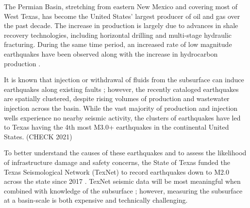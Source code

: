 \documentclass{utexasthesis}
\begin{document}
The Permian Basin, stretching from eastern New Mexico and covering most of West Texas, has become the United States' largest producer of oil and gas over the past decade. The increase in production is largely due to advances in shale recovery technologies, including horizontal drilling and multi-stage hydraulic fracturing.
During the same time period, an increased rate of low magnitude earthquakes have been observed along with the increase in hydrocarbon production
\citep{Frohlich2016HistoricalReviewInduced, Atkinson2016HydraulicFracturingSeismicity, Frohlich2019OnsetCauseIncreased, Lomax2019ImprovingAbsoluteEarthquake, Savvaidis2020InducedSeismicityDelaware, Skoumal2020InducedSeismicityDelaware}.

It is known that injection or withdrawal of fluids from the subsurface can induce earthquakes along existing faults \citep{Simpson1988TwoTypesReservoir, Ellsworth2013InjectionInducedEarthquakes}; however, the recently cataloged earthquakes are spatially clustered, despite rising volumes of production and wastewater injection across the basin. 
While the vast majority of production and injection wells experience no nearby seismic activity, the clusters of earthquakes have led to Texas having the 4th most M3.0+ earthquakes in the continental United States. (CHECK 2021)





To better understand the causes of these earthquakes and to assess the likelihood of infrastructure damage and safety concerns, the State of Texas funded the Texas Seismological Network (TexNet) to record earthquakes down to M2.0 across the state since 2017 \citep{Savvaidis2019TexnetStatewideSeismological}. TexNet seismic data will be most meaningful when combined with knowledge of the subsurface \citep{Council2013InducedSeismicityPotential, TheAcademyofMedicine2017EnvironmentalCommunityImpacts}; however, measuring the subsurface at a basin-scale is both expensive and technically challenging.
 
\end{document}
